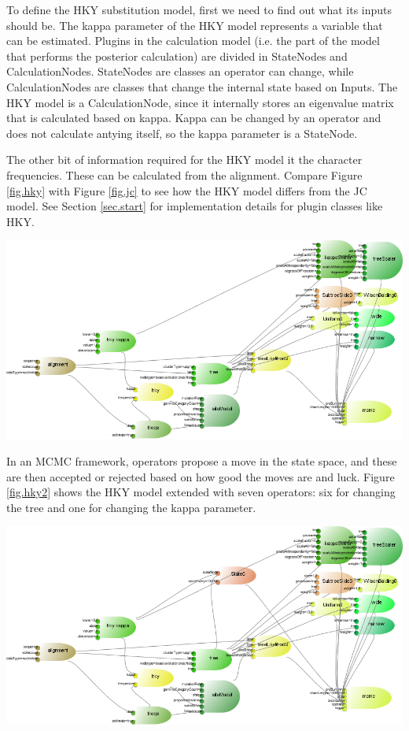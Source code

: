 \documentclass{article}
\begin{document}
To define the HKY substitution model, first we need to find out what its inputs should be.
The kappa parameter of the HKY model represents a variable that can be estimated.
Plugins in the calculation model (i.e. the part of the model that performs the posterior
calculation) are divided in StateNodes and CalculationNodes. StateNodes are classes
an operator can change, while CalculationNodes are classes that change the internal
state based on Inputs. 
The HKY model is a CalculationNode, since it internally stores an eigenvalue 
matrix that is calculated based on kappa. Kappa can be changed by an operator and does
not calculate antying itself, so the kappa parameter is a StateNode.

The other bit of information required for the HKY model it the character frequencies.
These can be calculated from the alignment.%
Compare Figure \ref{fig.hky} with Figure \ref{fig.jc} to see how the HKY model differs
from the JC model.
See Section \ref{sec.start} for implementation details for plugin classes like HKY.


\includegraphics[width=\textwidth]{example3.png}
\rm\\\hskip10pt

In an MCMC framework, operators propose a move in the state space, and these are
then accepted or rejected based on how good the moves are and luck. Figure \ref{fig.hky2}
shows the HKY model extended with seven operators: six for changing the tree and
one for changing the kappa parameter.


\includegraphics[width=\textwidth]{example4.png}
\rm\\\hskip10pt
\end{document}

